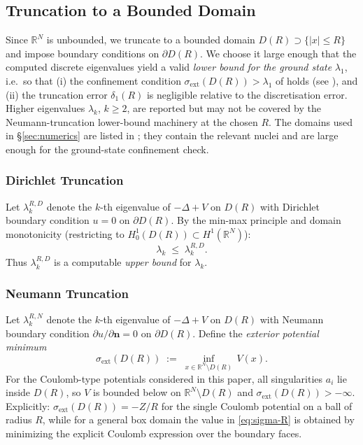 \documentclass[11pt]{article}
\theoremstyle{plain}
\theoremstyle{definition}
\theoremstyle{remark}
\newcommand{\R}{\mathbb{R}}
\begin{document}
\subsection{Truncation to a Bounded Domain}
\label{subsec:truncation}

Since $\R^N$ is unbounded, we truncate to a bounded domain
$D(R)\supset\{|x|\le R\}$ and impose boundary conditions on
$\partial D(R)$. We choose it large enough that the computed discrete eigenvalues
yield a valid \emph{lower bound for the ground state}
$\lambda_1$, i.e.\ so that (i) the confinement condition
$\sigma_{\mathrm{ext}}(D(R))>\lambda_1$ of 
holds (see ), and (ii) the
truncation error $\delta_1(R)$ is negligible relative to the
discretisation error. Higher eigenvalues $\lambda_k$, $k\ge 2$,
are reported but may not be covered by the Neumann-truncation
lower-bound machinery at the chosen $R$.
The domains used in \S\ref{sec:numerics} are listed in
; they contain the relevant nuclei
and are large enough for the ground-state confinement check.

\subsubsection*{Dirichlet Truncation}

Let $\lambda_k^{R,D}$ denote the $k$-th eigenvalue of
$-\Delta + V$ on $D(R)$ with Dirichlet boundary condition
$u = 0$ on $\partial D(R)$.  By the min-max principle and domain
monotonicity (restricting to $H^1_0(D(R)) \subset H^1(\R^N)$):
\begin{equation}
\label{eq:dirichlet-upper}
  \lambda_k \;\le\; \lambda_k^{R,D}.
\end{equation}
Thus $\lambda_k^{R,D}$ is a computable \emph{upper bound} for $\lambda_k$.

\subsubsection*{Neumann Truncation}

Let $\lambda_k^{R,N}$ denote the $k$-th eigenvalue of $-\Delta+V$
on $D(R)$ with Neumann boundary condition
$\partial u/\partial\bm{n} = 0$ on $\partial D(R)$.
Define the \emph{exterior potential minimum}
\begin{equation}
\label{eq:sigma-R}
  \sigma_{\mathrm{ext}}(D(R)) \;:=\; \inf_{x\in\R^N\setminus D(R)}\, V(x).
\end{equation}
For the Coulomb-type potentials considered in this paper, all
singularities $a_i$ lie inside $D(R)$, so $V$ is bounded below
on $\R^N\setminus D(R)$ and $\sigma_{\mathrm{ext}}(D(R)) > -\infty$.
Explicitly: $\sigma_{\mathrm{ext}}(D(R)) = -Z/R$ for the single
Coulomb potential on a ball of radius $R$, while for a general
box domain the value in \eqref{eq:sigma-R} is obtained by minimizing
the explicit Coulomb expression over the boundary faces.
\end{document}

